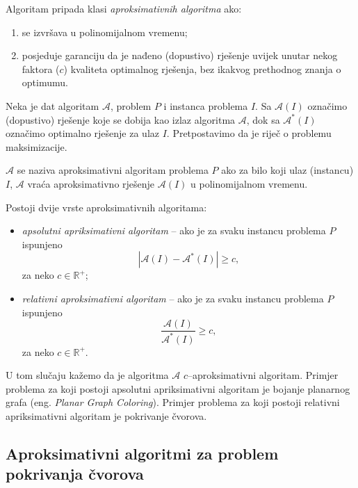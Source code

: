 \documentclass[a4paper, utf8, 11pt, colorlinks]{book}
\begin{document}
  \noindent Algoritam pripada klasi \emph{aproksimativnih algoritma} ako:
  \begin{enumerate}
  	\item se izvršava u polinomijalnom vremenu;
  	\item posjeduje garanciju da je nađeno (dopustivo) rješenje uvijek unutar nekog faktora ($c$) kvaliteta optimalnog rješenja, bez ikakvog prethodnog znanja o optimumu.
  \end{enumerate}
  Neka je dat algoritam $\mathcal{A}$, problem $P$ i instanca problema $I$. Sa $\mathcal{A}(I)$ označimo (dopustivo) rješenje koje se dobija kao izlaz algoritma $\mathcal{A}$, dok sa $\mathcal{A}^*(I)$ označimo optimalno rješenje za ulaz $I$. Pretpostavimo da je riječ o problemu maksimizacije. 
  
  $\mathcal{A}$ se naziva aproksimativni algoritam problema $P$ ako 
  za bilo koji ulaz (instancu) $I$, $\mathcal{A}$ vraća aproksimativno rješenje $\mathcal{A}(I)$ u polinomijalnom vremenu. 
  
  Postoji dvije vrste aproksimativnih algoritama:
  \begin{itemize}
  	\item \emph{apsolutni apriksimativni algoritam} -- ako je za svaku instancu problema $P$ ispunjeno
  	$$ |\mathcal{A}(I) - \mathcal{A}^*(I)| \geq c,$$ za neko $c\in \mathbb{R}^+$;
  	\item \emph{relativni aproksimativni algoritam} -- ako je   za svaku instancu problema $P$ ispunjeno
  	$$\frac{\mathcal{A}(I)}{\mathcal{A}^*(I)} \geq c,$$ za neko $c\in \mathbb{R}^+$.
  \end{itemize}
  
  \noindent U tom slučaju kažemo da je algoritma $\mathcal{A}$ $c$--aproksimativni algoritam.
  Primjer problema za koji postoji apsolutni apriksimativni algoritam je bojanje planarnog grafa (eng. \emph{Planar Graph Coloring}). Primjer problema za koji postoji relativni apriksimativni algoritam je pokrivanje čvorova. 
  
  \subsection{Aproksimativni algoritmi za problem pokrivanja čvorova}
  
\end{document}
